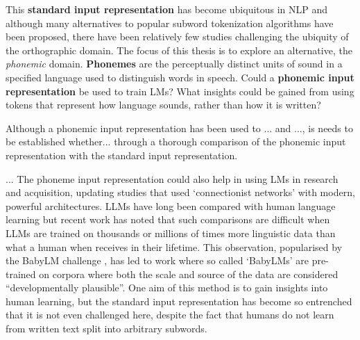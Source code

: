This \textbf{standard input representation} has become ubiquitous in NLP and although many alternatives to popular subword tokenization algorithms have been proposed, there have been relatively few studies challenging the ubiquity of the orthographic domain. The focus of this thesis is to explore an alternative, the \emph{phonemic} domain. \textbf{Phonemes} are the perceptually distinct units of sound in a specified language used to distinguish words in speech. Could a \textbf{phonemic input representation} be used to train LMs? What insights could be gained from using tokens that represent how language sounds, rather than how it is written? 

Although a phonemic input representation has been used to ... and ..., is needs to be established whether... through a thorough comparison of the phonemic input representation with the standard input representation.


... The phoneme input representation could also help in using LMs in research and acquisition, updating studies that used `connectionist networks' with modern, powerful architectures. LLMs have long been compared with human language learning but recent work has noted that such comparisons are difficult when LLMs are trained on thousands or millions of times more linguistic data than what a human when receives in their lifetime. This observation, popularised by the BabyLM challenge \addcites, has led to work where so called `BabyLMs' are pre-trained on corpora where both the scale and source of the data are considered ``developmentally plausible''. One aim of this method is to gain insights into human learning, but the standard input representation has become so entrenched that it is not even challenged here, despite the fact that humans do not learn from written text split into arbitrary subwords.






